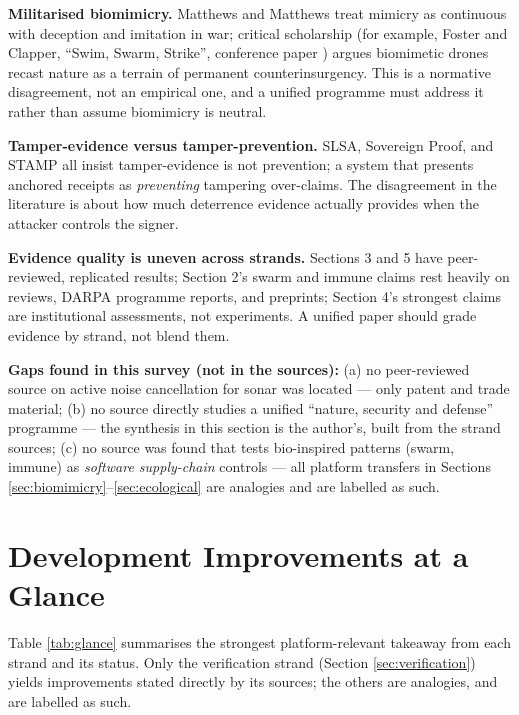 \documentclass[11pt]{article}
\begin{document}
\textbf{Militarised biomimicry.} Matthews and Matthews treat mimicry
as continuous with deception and imitation in war; critical scholarship
(for example, Foster and Clapper, ``Swim, Swarm, Strike'', conference
paper \cite{foster2026}) argues biomimetic drones recast nature as a
terrain of permanent counterinsurgency. This is a normative
disagreement, not an empirical one, and a unified programme must address
it rather than assume biomimicry is neutral.

\textbf{Tamper-evidence versus tamper-prevention.} SLSA, Sovereign
Proof, and STAMP all insist tamper-evidence is not prevention; a system
that presents anchored receipts as \emph{preventing} tampering
over-claims. The disagreement in the literature is about how much
deterrence evidence actually provides when the attacker controls the
signer.

\textbf{Evidence quality is uneven across strands.} Sections 3 and 5
have peer-reviewed, replicated results; Section 2's swarm and immune
claims rest heavily on reviews, DARPA programme reports, and preprints;
Section 4's strongest claims are institutional assessments, not
experiments. A unified paper should grade evidence by strand, not blend
them.

\textbf{Gaps found in this survey (not in the sources):} (a) no
peer-reviewed source on active noise cancellation for sonar was located
--- only patent and trade material; (b) no source directly studies a
unified ``nature, security and defense'' programme --- the synthesis in
this section is the author's, built from the strand sources; (c) no
source was found that tests bio-inspired patterns (swarm, immune) as
\emph{software supply-chain} controls --- all platform transfers in
Sections \ref{sec:biomimicry}--\ref{sec:ecological} are analogies and
are labelled as such.

\section{Development Improvements at a Glance}
\label{sec:at-a-glance}

Table \ref{tab:glance} summarises the strongest platform-relevant
takeaway from each strand and its status. Only the verification strand
(Section \ref{sec:verification}) yields improvements stated directly by
its sources; the others are analogies, and are labelled as such.
\end{document}
